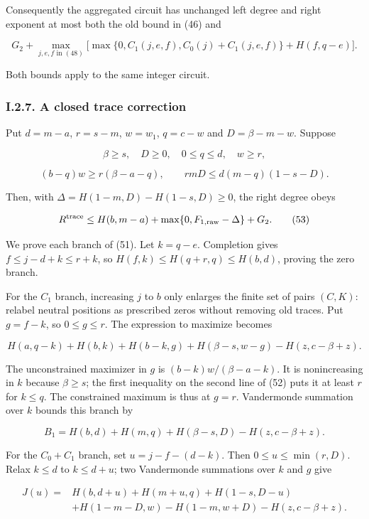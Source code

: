 Consequently the aggregated circuit has unchanged left degree and right exponent at most both the old bound in (46) and

\[
G_2+\max_{j,e,f\text{ in }(48)}
\bigl[\max\{0,C_1(j,e,f),C_0(j)+C_1(j,e,f)\}+H(f,q-e)\bigr].
\tag{51}
\]

Both bounds apply to the same integer circuit.

\hypertarget{af-a9ec399514-i.2.7.-a-closed-trace-correction}{%
\subsubsection{I.2.7. A closed trace correction}\label{af-a9ec399514-i.2.7.-a-closed-trace-correction}}

Put \(d=m-a\), \(r=s-m\), \(w=w_1\), \(q=c-w\) and \(D=\beta-m-w\). Suppose

\[
\beta\ge s,\quad D\ge0,\quad0\le q\le d,\quad w\ge r,
\]

\[
(b-q)w\ge r(\beta-a-q),\qquad
rmD\le d(m-q)(1-s-D).
\tag{52}
\]

Then, with \(\Delta=H(1-m,D)-H(1-s,D)\ge0\), the right degree obeys

\[
R^{\rm trace}\le H(b,m-a)+\max\{0,F_{1,\mathrm{raw}}-\Delta\}+G_2.
\tag{53}
\]

We prove each branch of (51). Let \(k=q-e\). Completion gives \(f\le j-d+k\le r+k\), so \(H(f,k)\le H(q+r,q)\le H(b,d)\), proving the zero branch.

For the \(C_1\) branch, increasing \(j\) to \(b\) only enlarges the finite set of pairs \((C,K)\): relabel neutral positions as prescribed zeros without removing old traces. Put \(g=f-k\), so \(0\le g\le r\). The expression to maximize becomes

\[
H(a,q-k)+H(b,k)+H(b-k,g)+H(\beta-s,w-g)-H(z,c-\beta+z).
\]

The unconstrained maximizer in \(g\) is \((b-k)w/(\beta-a-k)\). It is nonincreasing in \(k\) because \(\beta\ge s\); the first inequality on the second line of (52) puts it at least \(r\) for \(k\le q\). The constrained maximum is thus at \(g=r\). Vandermonde summation over \(k\) bounds this branch by

\[
B_1=H(b,d)+H(m,q)+H(\beta-s,D)-H(z,c-\beta+z).
\tag{54}
\]

For the \(C_0+C_1\) branch, set \(u=j-f-(d-k)\). Then \(0\le u\le\min(r,D)\). Relax \(k\le d\) to \(k\le d+u\); two Vandermonde summations over \(k\) and \(g\) give

\[
\begin{aligned}
J(u)={}&H(b,d+u)+H(m+u,q)+H(1-s,D-u)\\
&+H(1-m-D,w)-H(1-m,w+D)-H(z,c-\beta+z).
\end{aligned}
\tag{55}
\]

